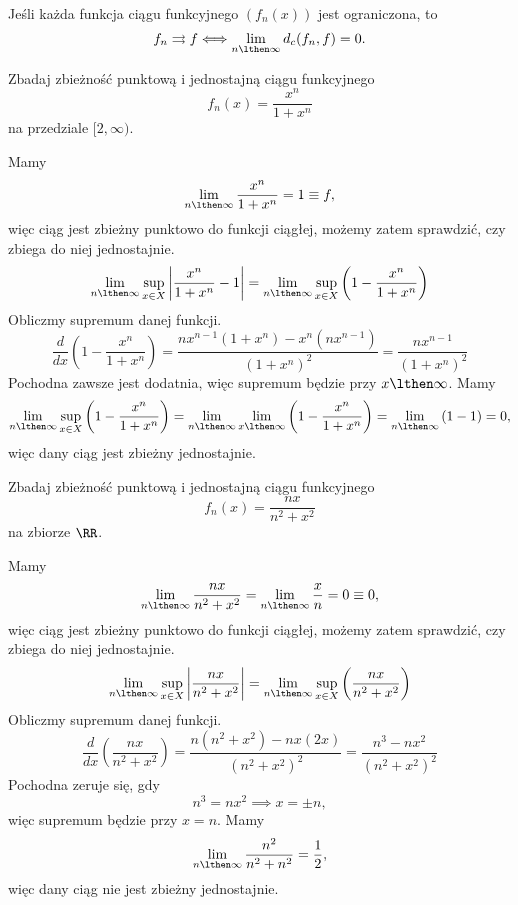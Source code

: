 \begin{theorem}
    Jeśli każda funkcja ciągu funkcyjnego $(f_n(x))$ jest ograniczona, to
    \[ f_n \rightrightarrows f \Longleftrightarrow \lim_{n\lthen\infty}d_c(f_n, f) = 0 .\]
\end{theorem}

\begin{example}
    Zbadaj zbieżność punktową i jednostajną ciągu funkcyjnego
    \[ f_n(x) = \frac{x^n}{1 + x^n} \]
    na przedziale $[2, \infty)$.
\end{example}
\begin{solution}
    Mamy
    \[ \lim_{n\lthen\infty} \frac{x^n}{1 + x^n} = 1 \equiv f, \]
    więc ciąg jest zbieżny punktowo do funkcji ciągłej, możemy zatem sprawdzić, czy zbiega do niej jednostajnie.
    \[ \lim_{n\lthen\infty}\sup_{x\in X} \left|\frac{x^n}{1 + x^n} - 1\right| = \lim_{n\lthen\infty}\sup_{x\in X} \left(1 - \frac{x^n}{1 + x^n}\right)\]
    Obliczmy supremum danej funkcji.
    \[ \frac{d}{dx} \left(1 - \frac{x^n}{1 + x^n}\right) = \frac{nx^{n-1}(1 + x^n) - x^n(nx^{n-1})}{\left(1 + x^n\right)^2} = \frac{nx^{n-1}}{\left(1 + x^n\right)^2} \]
    Pochodna zawsze jest dodatnia, więc supremum będzie przy $x \lthen \infty$. Mamy
    \[ \lim_{n\lthen\infty}\sup_{x\in X} \left(1 - \frac{x^n}{1 + x^n}\right) = \lim_{n\lthen\infty}\lim_{x\lthen\infty} \left(1 - \frac{x^n}{1 + x^n}\right) = \lim_{n\lthen\infty} \left(1 - 1\right) = 0, \]
    więc dany ciąg jest zbieżny jednostajnie.
\end{solution}

\begin{example}
    Zbadaj zbieżność punktową i jednostajną ciągu funkcyjnego
    \[ f_n(x) = \frac{nx}{n^2 + x^2} \]
    na zbiorze $\RR$.
\end{example}
\begin{solution}
    Mamy
    \[ \lim_{n\lthen\infty} \frac{nx}{n^2 + x^2} = \lim_{n\lthen\infty} \frac{x}{n} = 0 \equiv 0, \]
    więc ciąg jest zbieżny punktowo do funkcji ciągłej, możemy zatem sprawdzić, czy zbiega do niej jednostajnie.
    \[ \lim_{n\lthen\infty}\sup_{x\in X} \left|\frac{nx}{n^2 + x^2}\right| = \lim_{n\lthen\infty}\sup_{x\in X} \left(\frac{nx}{n^2 + x^2}\right) \]
    Obliczmy supremum danej funkcji.
    \[ \frac{d}{dx}\left(\frac{nx}{n^2 + x^2}\right) = \frac{n(n^2 + x^2) - nx(2x)}{\left(n^2 + x^2\right)^2} = \frac{n^3 - nx^2}{\left(n^2 + x^2\right)^2} \]
    Pochodna zeruje się, gdy
    \[ n^3 = nx^2 \implies x = \pm n, \]
    więc supremum będzie przy $x = n$. Mamy
    \[ \lim_{n\lthen\infty}\frac{n^2}{n^2 + n^2} = \frac{1}{2}, \]
    więc dany ciąg nie jest zbieżny jednostajnie.
\end{solution}


